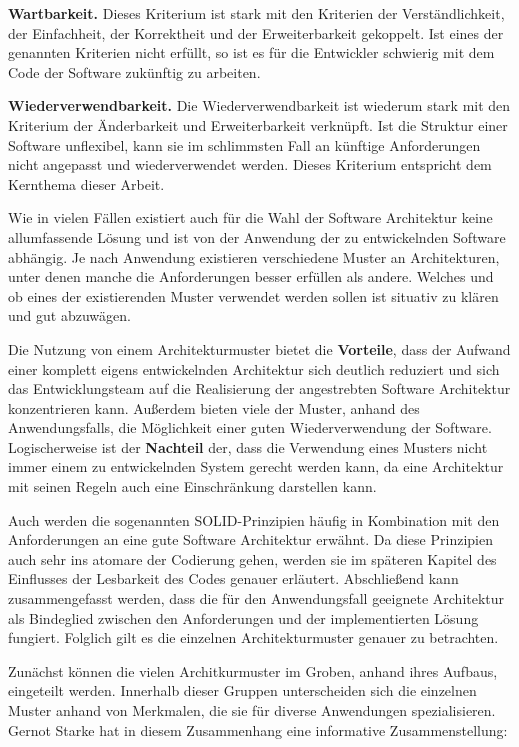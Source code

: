 \documentclass[utf8,biblatex]{lni}
\begin{document}
\textbf{Wartbarkeit.} Dieses Kriterium ist stark mit den Kriterien der Verständlichkeit, der Einfachheit, der Korrektheit und der Erweiterbarkeit gekoppelt. Ist eines der genannten Kriterien nicht erfüllt, so ist es für die Entwickler schwierig mit dem Code der Software zukünftig zu arbeiten.

\textbf{Wiederverwendbarkeit.} Die Wiederverwendbarkeit ist wiederum stark mit den Kriterium der Änderbarkeit und Erweiterbarkeit verknüpft. Ist die Struktur einer Software unflexibel, kann sie im schlimmsten Fall an künftige Anforderungen nicht angepasst und wiederverwendet werden. Dieses Kriterium entspricht dem Kernthema dieser Arbeit.

Wie in vielen Fällen existiert auch für die Wahl der Software Architektur keine allumfassende Lösung und ist von der Anwendung der zu entwickelnden Software abhängig. Je nach Anwendung existieren verschiedene Muster an Architekturen, unter denen manche die Anforderungen besser erfüllen als andere. Welches und ob eines der existierenden Muster verwendet werden sollen ist situativ zu klären und gut abzuwägen.

Die Nutzung von einem Architekturmuster bietet die \textbf{Vorteile}, dass der Aufwand einer komplett eigens entwickelnden Architektur sich deutlich reduziert und sich das Entwicklungsteam auf die Realisierung der angestrebten Software Architektur konzentrieren kann. Außerdem bieten viele der Muster, anhand des Anwendungsfalls, die Möglichkeit einer guten Wiederverwendung der Software. Logischerweise ist der \textbf{Nachteil} der, dass die Verwendung eines Musters nicht immer einem zu entwickelnden System gerecht werden kann, da eine Architektur mit seinen Regeln auch eine Einschränkung darstellen kann.

Auch werden die sogenannten SOLID-Prinzipien häufig in Kombination  mit den Anforderungen an eine gute Software Architektur erwähnt. Da diese Prinzipien auch sehr ins atomare der Codierung gehen, werden sie im späteren Kapitel des Einflusses der Lesbarkeit des Codes genauer erläutert. Abschließend kann zusammengefasst werden, dass die für den Anwendungsfall geeignete Architektur als Bindeglied zwischen den Anforderungen und der implementierten Lösung fungiert. Folglich gilt es die einzelnen Architekturmuster genauer zu betrachten.


Zunächst können die vielen Architkurmuster im Groben, anhand ihres Aufbaus, eingeteilt werden. Innerhalb dieser Gruppen unterscheiden sich die einzelnen Muster anhand von Merkmalen, die sie für diverse Anwendungen spezialisieren. Gernot Starke hat in diesem Zusammenhang eine informative Zusammenstellung:
\end{document}
